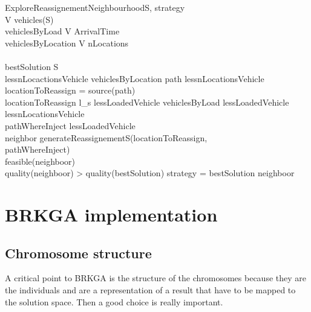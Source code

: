 \documentclass[]{report}
\begin{document}
\begin{pseudocode}{ExploreReassignementNeighbourhood}{S, strategy}
\label{pc:reassignement_neighbourhood}
	\\
	V \GETS vehicles(S)\\
	vehiclesByLoad \GETS {} V  ArrivalTime \\
	vehiclesByLocation \GETS {} V  nLocations \\
	\\
	bestSolution \GETS S\\
	\FOREACH lessnLocactionsVehicle \in vehiclesByLocation \DO
	\BEGIN
		\FOREACH path \in lessnLocationsVehicle \DO
		\BEGIN
			locationToReassign = source(path)\\
			\IF locationToReassign \neq l_{s} \THEN
			\BEGIN
				\FOREACH lessLoadedVehicle \in vehiclesByLoad \DO
					\IF lessLoadedVehicle \neq lessnLocationsVehicle \THEN
					\BEGIN
						\\
						\FOREACH pathWhereInject \in lessLoadedVehicle \DO
						\BEGIN
							\\
							neighbor \GETS generateReassignementS(locationToReassign,\\
							\quad \quad \quad \quad pathWhereInject)\\
							\IF feasible(neighboor) \AND \\
							\quad \quad \quad \quad quality(neighboor) > quality(bestSolution) \THEN
							\BEGIN
								\IF strategy =  \THEN
								\ELSE
									bestSolution \GETS neighboor\\
							\END
						\END
					\END
			\END
		\END
	\END
\end{pseudocode}

\section{BRKGA implementation}

\subsection{Chromosome structure}

A critical point to BRKGA is the structure of the chromosomes because they are the individuals and are a representation of a result that have to be mapped to the solution space. Then a good choice is really important.
\end{document}
